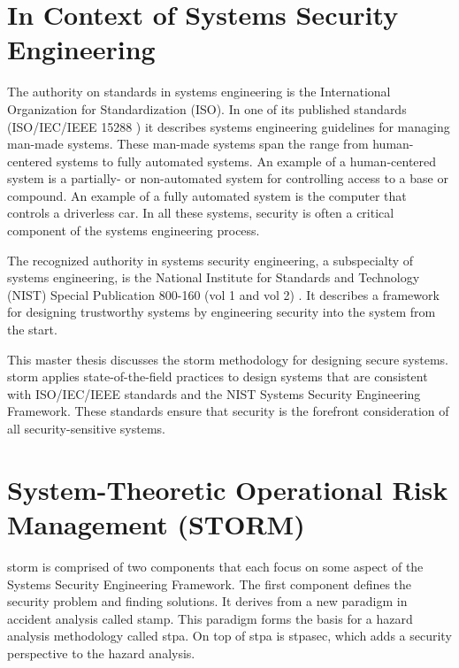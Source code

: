 \documentclass[../../main/main.tex]{subfiles}
\begin{document}
\section{In Context of Systems Security Engineering}\label{sec:intro:motivation}
The authority on standards in systems engineering is the International Organization for Standardization (ISO).  In one of its published standards (ISO/IEC/IEEE 15288 \cite{iso15288}) it describes systems engineering guidelines for managing man-made systems.  These man-made systems span the range from human-centered systems to fully automated systems.  An example of a human-centered system is a partially- or non-automated system for controlling access to a base or compound.  An example of a fully automated system is the computer that controls a driverless car.  In all these systems, security is often a critical component of the systems engineering process.


The recognized authority in systems security engineering, a subspecialty of systems engineering, is the National Institute for Standards and Technology (NIST) Special Publication 800-160 (vol 1 and vol 2) \cite{NIST800160}.  It describes a framework for designing trustworthy systems by engineering security into the system from the start.  


This master thesis discusses the \Gls{storm} methodology for designing secure systems.  \gls{storm} applies state-of-the-field practices to design systems that are consistent with ISO/IEC/IEEE standards and the NIST Systems Security Engineering Framework.  These standards ensure that security is the forefront  consideration of all security-sensitive systems.  
%

\section{System-Theoretic Operational Risk Management (STORM)}\label{sec:intro:storm}
\Gls{storm} is comprised of two components that each focus on some aspect of the Systems Security Engineering Framework.  The first component defines the security problem and finding solutions. It derives from a new paradigm in accident analysis called \Gls{stamp}.  This paradigm forms the basis for a hazard analysis methodology called \Gls{stpa}.  On top of \gls{stpa} is \Gls{stpasec}, which adds a security perspective to the hazard analysis. 
\end{document}
